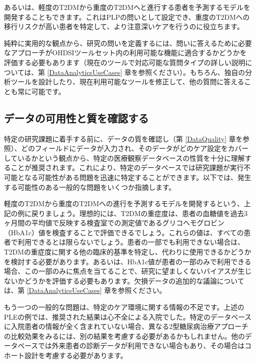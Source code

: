 \documentclass[
  11pt]{book}
\theoremstyle{definition}
\theoremstyle{definition}
\theoremstyle{definition}
\theoremstyle{definition}
\theoremstyle{remark}
\begin{document}
あるいは、軽度のT2DMから重度のT2DMへと進行する患者を予測するモデルを開発することもできます。これはPLPの問いとして設定でき、重度のT2DMへの移行リスクが高い患者を特定して、より注意深いケアを行うのに役立ちます。

純粋に実用的な観点から、研究の問いを定義するには、問いに答えるために必要なアプローチがOHDSIツールセット内の利用可能な機能に適合するかどうかを評価する必要もあります（現在のツールで対応可能な質問タイプの詳しい説明については、第 \ref{DataAnalyticsUseCases} 章を参照ください）。もちろん、独自の分析ツールを設計したり、現在利用可能なツールを修正して、他の質問に答えることも常に可能です。

\subsection{データの可用性と質を確認する}\label{ux30c7ux30fcux30bfux306eux53efux7528ux6027ux3068ux8ceaux3092ux78baux8a8dux3059ux308b}

特定の研究課題に着手する前に、データの質を確認し（第 \ref{DataQuality} 章を参照）、どのフィールドにデータが入力され、そのデータがどのケア設定をカバーしているかという観点から、特定の医療観察データベースの性質を十分に理解することが推奨されます。これにより、特定のデータベースでは研究課題が実行不可能となる可能性がある問題を迅速に特定することができます。以下では、発生する可能性のある一般的な問題をいくつか指摘します。

軽度のT2DMから重度のT2DMへの進行を予測するモデルを開発するという、上記の例に戻りましょう。理想的には、T2DMの重症度は、患者の血糖値を過去3ヶ月間の平均値で反映する検査室での測定値であるグリコヘモグロビン（HbA1c）値を検査することで評価できるでしょう。これらの値は、すべての患者で利用できるとは限らないでしょう。患者の一部でも利用できない場合は、T2DMの重症度に関する他の臨床的基準を特定し、代わりに使用できるかどうかを検討する必要があります。あるいは、HbA1c値が患者の一部のみで利用できる場合、この一部のみに焦点を当てることで、研究に望ましくないバイアスが生じないかどうかを評価する必要もあります。欠損データの追加的な議論については、第 \ref{DataAnalyticsUseCases} 章を参照ください。

もう一つの一般的な問題は、特定のケア環境に関する情報の不足です。上述のPLEの例では、推奨された結果は心不全による入院でした。特定のデータベースに入院患者の情報が全く含まれていない場合、異なる2型糖尿病治療アプローチの比較効果をみるには、別の結果を考慮する必要があるかもしれません。他のデータベースでは外来患者の診断データが利用できない場合もあり、その場合はコホート設計を考慮する必要があります。
\end{document}
